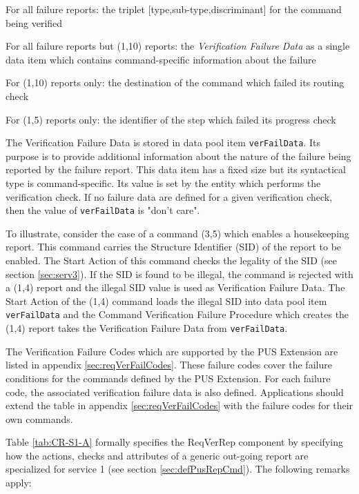 \documentclass{pnp_article}
\begin{document}
\begin{fw_itemize}
\item For all failure reports: the triplet [type,sub-type,discriminant] for the command being verified
\item For all failure reports but (1,10) reports: the \textit{Verification Failure Data} as a single data item which contains command-specific information about the failure 
\item For (1,10) reports only: the destination of the command which failed its routing check
\item For (1,5) reports only: the identifier of the step which failed its progress check
\end{fw_itemize}

The Verification Failure Data is stored in data pool item \texttt{verFailData}. Its purpose is to provide additional information about the nature of the failure being reported by the failure report. This data item has a fixed size but its syntactical type is command-specific. Its value is set by the entity which performs the verification check. If no failure data are defined for a given verification check, then the value of \texttt{verFailData} is "don't care". 

To illustrate, consider the case of a command (3,5) which enables a housekeeping report. This command carries the Structure Identifier (SID) of the report to be enabled. The Start Action of this command checks the legality of the SID (see section \ref{sec:serv3}). If the SID is found to be illegal, the command is rejected with a (1,4) report and the illegal SID value is used as Verification Failure Data. The Start Action of the (1,4) command loads the illegal SID into data pool item \texttt{verFailData} and the Command Verification Failure Procedure which creates the (1,4) report takes the Verification Failure Data from \texttt{verFailData}.

The Verification Failure Codes which are supported by the PUS Extension are listed in appendix \ref{sec:reqVerFailCodes}. These failure codes cover the failure conditions for the commands defined by the PUS Extension. For each failure code, the associated verification failure data is also defined. Applications should extend the table in appendix \ref{sec:reqVerFailCodes} with the failure codes for their own commands. 

Table \ref{tab:CR-S1-A} formally specifies the ReqVerRep component by specifying how the actions, checks and attributes of a generic out-going report are specialized for service 1 (see section \ref{sec:defPusRepCmd}). The following remarks apply: 
\end{document}
